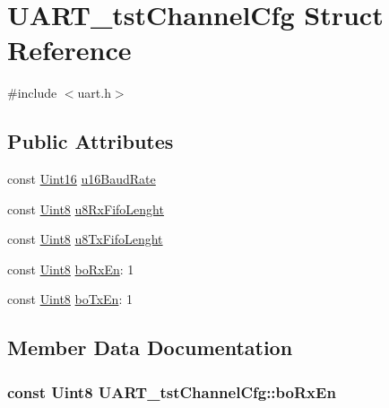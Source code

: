 \hypertarget{struct_u_a_r_t__tst_channel_cfg}{}\section{U\+A\+R\+T\+\_\+tst\+Channel\+Cfg Struct Reference}
\label{struct_u_a_r_t__tst_channel_cfg}


{\ttfamily \#include $<$uart.\+h$>$}

\subsection*{Public Attributes}
\begin{DoxyCompactItemize}
\item 
const \hyperlink{_d_s_p2833x___device_8h_a59a9f6be4562c327cbfb4f7e8e18f08b}{Uint16} \hyperlink{struct_u_a_r_t__tst_channel_cfg_a8456791055851cc12b1dcf57c8280f30}{u16\+Baud\+Rate}
\item 
const \hyperlink{_d_s_p2833x___device_8h_af84840501dec18061d18a68c162a8fa2}{Uint8} \hyperlink{struct_u_a_r_t__tst_channel_cfg_a3b73fb6bcbb02156116c7d88257ca146}{u8\+Rx\+Fifo\+Lenght}
\item 
const \hyperlink{_d_s_p2833x___device_8h_af84840501dec18061d18a68c162a8fa2}{Uint8} \hyperlink{struct_u_a_r_t__tst_channel_cfg_ad762999dc9891a6d9b8a5e6d42da79ac}{u8\+Tx\+Fifo\+Lenght}
\item 
const \hyperlink{_d_s_p2833x___device_8h_af84840501dec18061d18a68c162a8fa2}{Uint8} \hyperlink{struct_u_a_r_t__tst_channel_cfg_a64b4cd162e6a66d08e43d540a998009f}{bo\+Rx\+En}\+: 1
\item 
const \hyperlink{_d_s_p2833x___device_8h_af84840501dec18061d18a68c162a8fa2}{Uint8} \hyperlink{struct_u_a_r_t__tst_channel_cfg_a33e3153494fa6c826cbda1cbabf09f54}{bo\+Tx\+En}\+: 1
\end{DoxyCompactItemize}


\subsection{Member Data Documentation}
\hypertarget{struct_u_a_r_t__tst_channel_cfg_a64b4cd162e6a66d08e43d540a998009f}{}
\subsubsection[{bo\+Rx\+En}]{\setlength{\rightskip}{0pt plus 5cm}const {\bf Uint8} U\+A\+R\+T\+\_\+tst\+Channel\+Cfg\+::bo\+Rx\+En}\label{struct_u_a_r_t__tst_channel_cfg_a64b4cd162e6a66d08e43d540a998009f}
\hypertarget{struct_u_a_r_t__tst_channel_cfg_a33e3153494fa6c826cbda1cbabf09f54}{}

